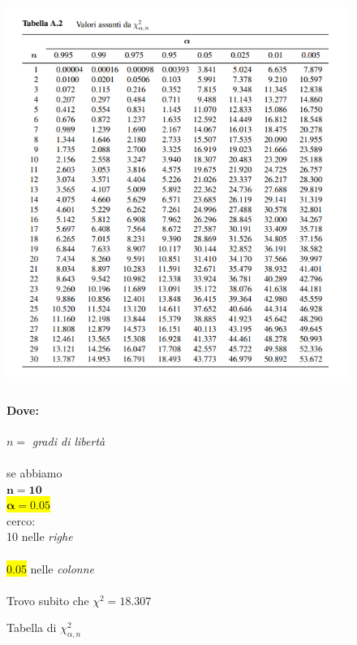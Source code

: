 \documentclass[]{article}
\begin{document}
    \begin{figure}[H]
        \caption{Tabella di $\chi_{\alpha, n}^2$}
        \begin{minipage}{0.59\textwidth}
            \includegraphics[width=\textwidth]{images/xan_table.png}
        \end{minipage}
        \begin{minipage}{0.4\textwidth}
            \paragraph{Dove:}
            $n = $ \textit{gradi di libertà} \\ \\
            se abbiamo \\
            \colorbox{bittersweet}{$\boldsymbol{n = 10}$} \\
            \colorbox{yellow}{$\boldsymbol{\alpha = 0.05}$} \\
            cerco: \\
            \colorbox{bittersweet}{10} nelle \textit{righe} \\ \\
            \colorbox{yellow}{0.05} nelle \textit{colonne} \\ \\
            Trovo subito che $\chi^2 = 18.307$
        \end{minipage}
    \end{figure}
\end{document}
